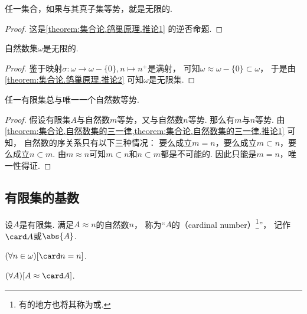 \begin{corollary}\label{theorem:集合论.鸽巢原理.推论2}
任一集合，如果与其真子集等势，就是无限的.
\begin{proof}
这是\cref{theorem:集合论.鸽巢原理.推论1} 的逆否命题.
\end{proof}
\end{corollary}

\begin{corollary}\label{theorem:集合论.鸽巢原理.推论3}
自然数集\(\omega\)是无限的.
\begin{proof}
鉴于映射\(\sigma\colon \omega \to \omega-\{0\}, n \mapsto n^+\)是满射，
可知\(\omega \approx \omega-\{0\} \subset \omega\)，
于是由\cref{theorem:集合论.鸽巢原理.推论2} 可知\(\omega\)是无限集.
\end{proof}
\end{corollary}

\begin{corollary}
任一有限集总与唯一一个自然数等势.
\begin{proof}
假设有限集\(A\)与自然数\(m\)等势，又与自然数\(n\)等势.
那么有\(m\)与\(n\)等势.
由\cref{theorem:集合论.自然数集的三一律,theorem:集合论.自然数集的三一律.推论1} 可知，
自然数的序关系只有以下三种情况：
要么成立\(m = n\)，要么成立\(m \subset n\)，要么成立\(n \subset m\).
由\(m \approx n\)可知\(m \subset n\)和\(n \subset m\)都是不可能的.
因此只能是\(m = n\)，唯一性得证.
\end{proof}
\end{corollary}

\subsection{有限集的基数}
\begin{definition}
设\(A\)是有限集.
满足\(A \approx n\)的自然数\(n\)，
称为“\(A\)的（cardinal number）\footnote{%
有的地方也将其称为或.}”，
记作\(\card A\)或\(\abs{A}\).
\end{definition}

\begin{example}
\((\forall n\in\omega)[\card n = n]\).
\end{example}

\begin{property}
\((\forall A)[A \approx \card A]\).
\end{property}

